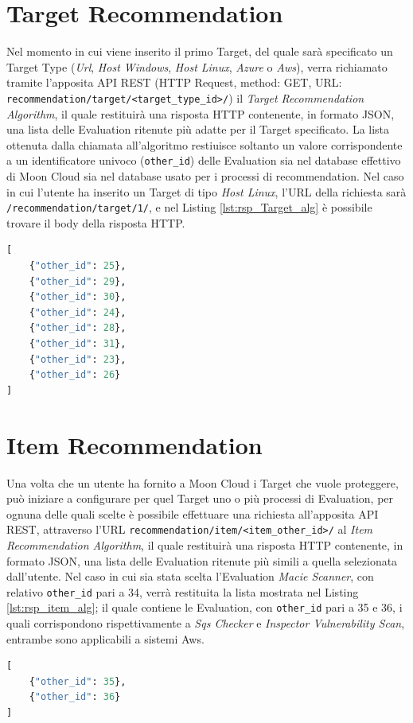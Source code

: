 \section*{Target Recommendation}
Nel momento in cui viene inserito il primo Target, del quale sarà specificato un Target Type (\textit{Url}, \textit{Host Windows}, 
\textit{Host Linux}, \textit{Azure} o \textit{Aws}), verra richiamato tramite l'apposita API REST (HTTP Request, method: GET, URL: 
\texttt{recommendation/target/<target\_type\_id>/}) il \textit{Target Recommendation Algorithm}, il quale restituirà una 
risposta HTTP contenente, in formato JSON, una lista delle Evaluation ritenute più adatte per il Target specificato. 
La lista ottenuta dalla chiamata all'algoritmo restiuisce soltanto un valore corrispondente a un 
identificatore univoco (\texttt{other\_id}) delle Evaluation sia nel database effettivo di Moon Cloud sia nel database usato 
per i processi di recommendation. Nel caso in cui l'utente ha inserito un Target di tipo \textit{Host Linux}, l'URL della 
richiesta sarà \texttt{/recommendation/target/1/}, e nel Listing \ref{lst:rsp_Target_alg} è possibile trovare il body 
della risposta HTTP.
\lstset{style=python_code_style}
\begin{lstlisting}[language=Python, label=lst:rsp_Target_alg, caption={Esempio del body della risposta HTTP alla chiamata del 
    \textit{Target Recommendation Algorithm}}]
[
    {"other_id": 25},
    {"other_id": 29},
    {"other_id": 30},
    {"other_id": 24},
    {"other_id": 28},
    {"other_id": 31},
    {"other_id": 23},
    {"other_id": 26}
]
\end{lstlisting}
%
\section*{Item Recommendation}
Una volta che un utente ha fornito a Moon Cloud i Target che vuole proteggere, può iniziare a configurare per quel Target uno 
o più processi di Evaluation, per ognuna delle quali scelte è possibile effettuare una richiesta all'apposita API REST, 
attraverso l'URL \texttt{recommendation/item/<item\_other\_id>/} al \textit{Item Recommendation Algorithm}, il quale 
restituirà una risposta HTTP contenente, in formato JSON, una lista delle Evaluation ritenute più simili a quella selezionata 
dall'utente. Nel caso in cui sia stata scelta l'Evaluation \textit{Macie Scanner}, con relativo \texttt{other\_id} pari a 34, 
verrà restituita la lista mostrata nel Listing \ref{lst:rsp_item_alg}; il quale 
contiene le Evaluation, con \texttt{other\_id} pari a 35 e 36, i quali corrispondono rispettivamente a \textit{Sqs Checker} 
e \textit{Inspector Vulnerability Scan}, entrambe sono applicabili a sistemi Aws.
\begin{lstlisting}[language=Python, label=lst:rsp_item_alg, caption={Esempio del body della risposta HTTP alla chiamata del 
    \textit{Item Recommendation Algorithm}}]
[
    {"other_id": 35},
    {"other_id": 36}
]
\end{lstlisting}
%
